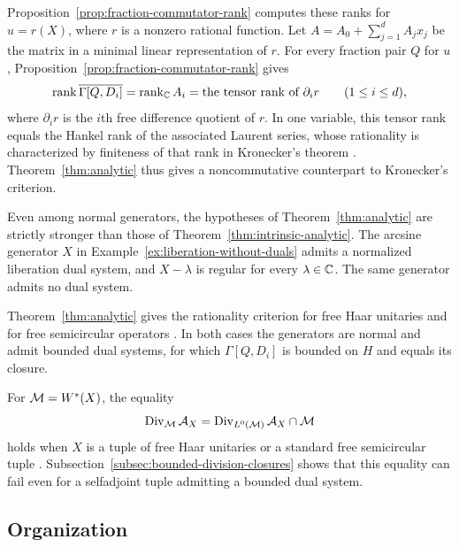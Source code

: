 Proposition~\ref{prop:fraction-commutator-rank} computes these ranks for $u=r(X)$, where $r$ is a nonzero rational function.
Let $A=A_0+\sum_{j=1}^d A_jx_j$ be the matrix in a minimal linear representation of $r$.
For every fraction pair $Q$ for $u$, Proposition~\ref{prop:fraction-commutator-rank} gives
\[
 \operatorname{rank}\overline{\Gamma[Q,D_i]}
 =\operatorname{rank}_{\mathbb C} A_i
 =\text{the tensor rank of }\partial_i r
 \qquad(1\leq i\leq d),
\]
where $\partial_i r$ is the $i$th free difference quotient of $r$.
In one variable, this tensor rank equals the Hankel rank of the associated Laurent series, whose rationality is characterized by finiteness of that rank in Kronecker's theorem \cite{Kro81}.
Theorem~\ref{thm:analytic} thus gives a noncommutative counterpart to Kronecker's criterion.

Even among normal generators, the hypotheses of Theorem~\ref{thm:analytic} are strictly stronger than those of Theorem~\ref{thm:intrinsic-analytic}.
The arcsine generator $X$ in Example~\ref{ex:liberation-without-duals} admits a normalized liberation dual system, and $X-\lambda$ is regular for every $\lambda\in\mathbb C$.
The same generator admits no dual system.

Theorem~\ref{thm:analytic} gives the rationality criterion for free Haar unitaries \cite{DR97,Lin00} and for free semicircular operators \cite{Miy22}.
In both cases the generators are normal and admit bounded dual systems, for which $\Gamma[Q,D_i]$ is bounded on $H$ and equals its closure.

For $\mathcal M=W^*(X)$, the equality
\[
 \operatorname{Div}_{\mathcal M}\mathcal A_X=\operatorname{Div}_{L^0(\mathcal M)}\mathcal A_X\cap\mathcal M
\]
holds when $X$ is a tuple of free Haar unitaries \cite[Theorem~1.1]{Lin00} or a standard free semicircular tuple \cite[Theorem~4.5]{Miy22}.
Subsection~\ref{subsec:bounded-division-closures} shows that this equality can fail even for a selfadjoint tuple admitting a bounded dual system.

\subsection{Organization}\label{subsec:organization}

